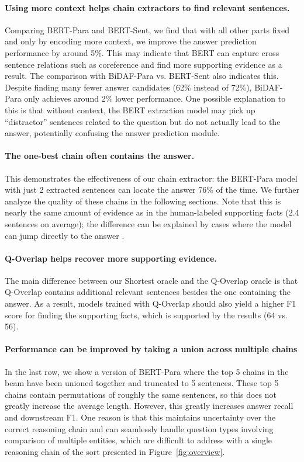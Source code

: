 \documentclass[11pt,a4paper]{article}
\begin{document}
\paragraph{Using more context helps chain extractors to find relevant sentences.} Comparing BERT-Para and BERT-Sent, we find that with all other parts fixed and only by encoding more context, we improve the answer prediction performance by around 5\%. This may indicate that BERT can capture cross sentence relations such as coreference and find more supporting evidence as a result. The comparison with BiDAF-Para vs. BERT-Sent also indicates this. Despite finding many fewer answer candidates (62\% instead of 72\%), BiDAF-Para only achieves around 2\% lower performance. One possible explanation to this is that without context, the BERT extraction model may pick up ``distractor'' sentences related to the question but do not actually lead to the answer, potentially confusing the answer prediction module.

\paragraph{The one-best chain often contains the answer.} This demonstrates the effectiveness of our chain extractor: the BERT-Para model with just 2 extracted sentences can locate the answer 76\% of the time. We further analyze the quality of these chains in the following sections. Note that this is nearly the same amount of evidence as in the human-labeled supporting facts (2.4 sentences on average); the difference can be explained by cases where the model can jump directly to the answer \citep{chen2019understanding}.

\paragraph{Q-Overlap helps recover more supporting evidence.} The main difference between our Shortest oracle and the Q-Overlap oracle is that Q-Overlap contains additional relevant sentences besides the one containing the answer. As a result, models trained with Q-Overlap should also yield a higher F1 score for finding the supporting facts, which is supported by the results (64 vs. 56).

\paragraph{Performance can be improved by taking a union across multiple chains} In the last row, we show a version of BERT-Para where the top 5 chains in the beam have been unioned together and truncated to 5 sentences. These top 5 chains contain permutations of roughly the same sentences, so this does not greatly increase the average length. However, this greatly increases answer recall and downstream F1. One reason is that this maintains uncertainty over the correct reasoning chain and can seamlessly handle question types involving comparison of multiple entities, which are difficult to address with a single reasoning chain of the sort presented in Figure~\ref{fig:overview}.
\end{document}
